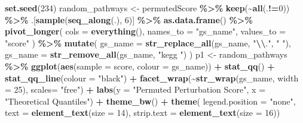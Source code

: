 \documentclass[9pt,a4paper,]{extarticle}
\newenvironment{Shaded}{\begin{snugshade}}{\end{snugshade}}
\newcommand{\AttributeTok}[1]{\textcolor[rgb]{0.13,0.29,0.53}{#1}}
\newcommand{\DecValTok}[1]{\textcolor[rgb]{0.00,0.00,0.81}{#1}}
\newcommand{\FunctionTok}[1]{\textcolor[rgb]{0.13,0.29,0.53}{\textbf{#1}}}
\newcommand{\NormalTok}[1]{#1}
\newcommand{\OtherTok}[1]{\textcolor[rgb]{0.56,0.35,0.01}{#1}}
\newcommand{\SpecialCharTok}[1]{\textcolor[rgb]{0.81,0.36,0.00}{\textbf{#1}}}
\newcommand{\StringTok}[1]{\textcolor[rgb]{0.31,0.60,0.02}{#1}}
\begin{document}
\begin{Shaded}
\begin{Highlighting}[]
\FunctionTok{set.seed}\NormalTok{(}\DecValTok{234}\NormalTok{)}
\NormalTok{random\_pathways }\OtherTok{\textless{}{-}}\NormalTok{ permutedScore }\SpecialCharTok{\%\textgreater{}\%}
    \FunctionTok{keep}\NormalTok{(}\SpecialCharTok{\textasciitilde{}}\FunctionTok{all}\NormalTok{(.}\SpecialCharTok{!=}\DecValTok{0}\NormalTok{)) }\SpecialCharTok{\%\textgreater{}\%}
\NormalTok{    .[}\FunctionTok{sample}\NormalTok{(}\FunctionTok{seq\_along}\NormalTok{(.), }\DecValTok{6}\NormalTok{)] }\SpecialCharTok{\%\textgreater{}\%}
    \FunctionTok{as.data.frame}\NormalTok{() }\SpecialCharTok{\%\textgreater{}\%}
    \FunctionTok{pivot\_longer}\NormalTok{(}
      \AttributeTok{cols =} \FunctionTok{everything}\NormalTok{(), }\AttributeTok{names\_to =} \StringTok{"gs\_name"}\NormalTok{, }\AttributeTok{values\_to =} \StringTok{"score"}
\NormalTok{    ) }\SpecialCharTok{\%\textgreater{}\%}
    \FunctionTok{mutate}\NormalTok{(}
        \AttributeTok{gs\_name =} \FunctionTok{str\_replace\_all}\NormalTok{(gs\_name, }\StringTok{"}\SpecialCharTok{\textbackslash{}\textbackslash{}}\StringTok{."}\NormalTok{, }\StringTok{" "}\NormalTok{),}
        \AttributeTok{gs\_name =} \FunctionTok{str\_remove\_all}\NormalTok{(gs\_name, }\StringTok{"kegg "}\NormalTok{)}
\NormalTok{    ) }
\NormalTok{p1 }\OtherTok{\textless{}{-}}\NormalTok{ random\_pathways }\SpecialCharTok{\%\textgreater{}\%}
  \FunctionTok{ggplot}\NormalTok{(}\FunctionTok{aes}\NormalTok{(}\AttributeTok{sample =}\NormalTok{ score, }\AttributeTok{colour =}\NormalTok{ gs\_name)) }\SpecialCharTok{+}
  \FunctionTok{stat\_qq}\NormalTok{() }\SpecialCharTok{+}
  \FunctionTok{stat\_qq\_line}\NormalTok{(}\AttributeTok{colour =} \StringTok{"black"}\NormalTok{) }\SpecialCharTok{+}
  \FunctionTok{facet\_wrap}\NormalTok{(}\SpecialCharTok{\textasciitilde{}}\FunctionTok{str\_wrap}\NormalTok{(gs\_name, }\AttributeTok{width =} \DecValTok{25}\NormalTok{), }\AttributeTok{scales=} \StringTok{"free"}\NormalTok{) }\SpecialCharTok{+} 
  \FunctionTok{labs}\NormalTok{(}\AttributeTok{y =} \StringTok{"Permuted Perturbation Score"}\NormalTok{, }\AttributeTok{x =} \StringTok{"Theoretical Quantiles"}\NormalTok{) }\SpecialCharTok{+}
  \FunctionTok{theme\_bw}\NormalTok{() }\SpecialCharTok{+}
  \FunctionTok{theme}\NormalTok{(}
      \AttributeTok{legend.position =} \StringTok{"none"}\NormalTok{, }
      \AttributeTok{text =} \FunctionTok{element\_text}\NormalTok{(}\AttributeTok{size =} \DecValTok{14}\NormalTok{), }
      \AttributeTok{strip.text =} \FunctionTok{element\_text}\NormalTok{(}\AttributeTok{size =} \DecValTok{16}\NormalTok{))}

\end{Highlighting}
\end{Shaded}
\end{document}
